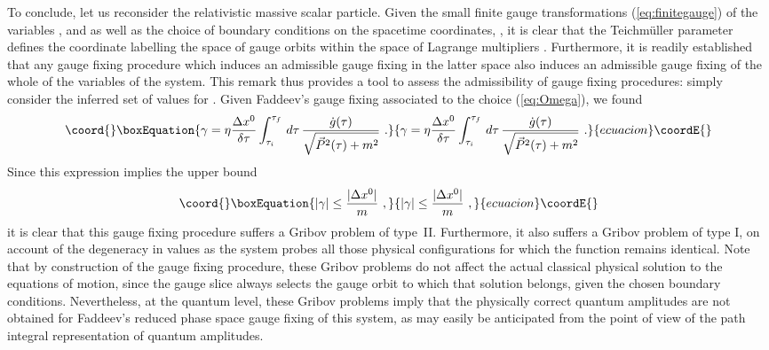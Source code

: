 \documentclass[a4paper,11pt]{article}
\begin{document}
To conclude, let us reconsider the relativistic massive scalar particle.
Given the small finite gauge transformations (\ref{eq:finitegauge}) of 
the variables \coordHE{}, \coordHE{} and \myHighlight{$\lambda(\tau)$}\coordHE{} as well as
the choice of boundary conditions on the spacetime coordinates, 
\coordHE{}, it is clear that the Teichm\"uller
parameter \myHighlight{$\gamma$}\coordHE{} defines the coordinate labelling the space of gauge
orbits within the space of Lagrange multipliers \myHighlight{$\lambda(\tau)$}\coordHE{}. 
Furthermore, it is readily established\cite{JG1} that any gauge fixing 
procedure which induces an admissible gauge fixing in the latter space also
induces an admissible gauge fixing of the whole of the variables
\coordHE{} of the system. This remark
thus provides a tool to assess the admissibility of gauge fixing
procedures: simply consider the inferred set of values for \myHighlight{$\gamma$}\coordHE{}.
Given Faddeev's gauge fixing associated to the choice (\ref{eq:Omega}),
we found
\begin{equation}\coord{}\boxEquation{
\gamma=\eta\frac{\Delta x^0}{\delta\tau}\int_{\tau_i}^{\tau_f}\,d\tau\,
\frac{\dot{g}(\tau)}{\sqrt{\vec{P}^2(\tau)+m^2}}\ .
}{
\gamma=\eta\frac{\Delta x^0}{\delta\tau}\int_{\tau_i}^{\tau_f}\,d\tau\,
\frac{\dot{g}(\tau)}{\sqrt{\vec{P}^2(\tau)+m^2}}\ .
}{ecuacion}\coordE{}\end{equation}
Since this expression implies the upper bound
\begin{equation}\coord{}\boxEquation{
|\gamma|\le\frac{|\Delta x^0|}{m}\ ,
}{
|\gamma|\le\frac{|\Delta x^0|}{m}\ ,
}{ecuacion}\coordE{}\end{equation}
it is clear that this gauge fixing procedure suffers a Gribov problem
of type~II. Furthermore, it also suffers a Gribov problem of type I,
on account of the degeneracy in \myHighlight{$\gamma$}\coordHE{} values as the system probes
all those physical configurations for which the function \coordHE{} 
remains identical.\cite{JG1,JG5} Note that by construction of the gauge 
fixing procedure,
these Gribov problems do not affect the actual classical physical solution
to the equations of motion, since the gauge slice always selects the gauge
orbit to which that solution belongs, given the chosen boundary conditions.
Nevertheless, at the quantum level, these Gribov pro\-blems imply that the
physically correct quantum amplitudes are not obtained for Faddeev's
reduced phase space gauge fixing of this system,\cite{JG1,JG5} as may 
ea\-si\-ly be anticipated from the point of view of the path integral 
representation of quantum amplitudes.
\end{document}
